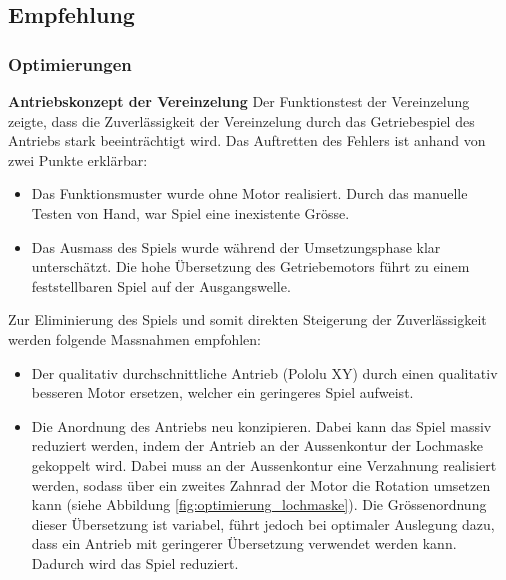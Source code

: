 \subsection{Empfehlung}

\subsubsection{Optimierungen}

\textbf{Antriebskonzept der Vereinzelung}
\newline
Der Funktionstest der Vereinzelung zeigte, dass die Zuverlässigkeit der Vereinzelung durch das Getriebespiel des Antriebs stark beeinträchtigt wird. Das Auftretten des Fehlers ist anhand von zwei Punkte erklärbar:
\begin{itemize}
	\item Das Funktionsmuster wurde ohne Motor realisiert. Durch das manuelle Testen von Hand, war Spiel eine inexistente Grösse.
	
	\item Das Ausmass des Spiels wurde während der Umsetzungsphase klar unterschätzt. Die hohe Übersetzung des Getriebemotors führt zu einem feststellbaren Spiel auf der Ausgangswelle.
\end{itemize}

Zur Eliminierung des Spiels und somit direkten Steigerung der Zuverlässigkeit werden folgende Massnahmen empfohlen:

\begin{itemize}
	\item Der qualitativ durchschnittliche Antrieb (Pololu XY) durch einen qualitativ besseren Motor ersetzen, welcher ein geringeres Spiel aufweist.
	
	\item Die Anordnung des Antriebs neu konzipieren. Dabei kann das Spiel massiv reduziert werden, indem der Antrieb an der Aussenkontur der Lochmaske gekoppelt wird. Dabei muss an der Aussenkontur eine Verzahnung realisiert werden, sodass über ein zweites Zahnrad der Motor die Rotation umsetzen kann (siehe Abbildung \ref{fig:optimierung_lochmaske}). Die Grössenordnung dieser Übersetzung ist variabel, führt jedoch bei optimaler Auslegung dazu, dass ein Antrieb mit geringerer Übersetzung verwendet werden kann. Dadurch wird das Spiel reduziert. 
\end{itemize}

